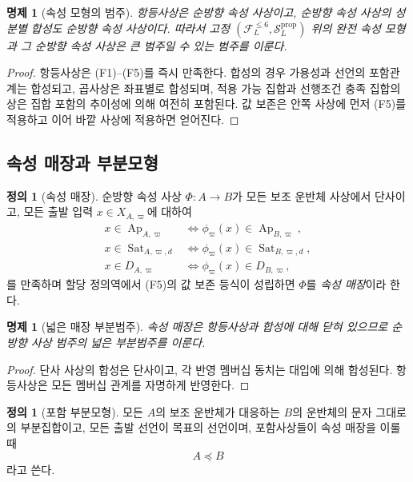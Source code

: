 \documentclass[11pt]{article}
\newcommand{\FVI}{\mathcal F_{L}^{\le 6}}
\newcommand{\Sprop}{\mathcal S_{L}^{\mathrm{prop}}}
\newcommand{\Ap}{\operatorname{Ap}}
\newcommand{\Sat}{\operatorname{Sat}}
\newtheorem{proposition}[theorem]{명제}
\theoremstyle{definition}
\newtheorem{definition}[theorem]{정의}
\theoremstyle{remark}
\begin{document}
\begin{proposition}[속성 모형의 범주]
항등사상은 순방향 속성 사상이고, 순방향 속성 사상의 성분별 합성도 순방향 속성 사상이다.
따라서 고정 \((\FVI,\Sprop)\) 위의 완전 속성 모형과 그 순방향 속성 사상은 큰 범주일 수 있는 범주를 이룬다.
\end{proposition}

\begin{proof}
항등사상은 (F1)--(F5)를 즉시 만족한다.
합성의 경우 가용성과 선언의 포함관계는 합성되고, 곱사상은 좌표별로 합성되며, 적용 가능 집합과 선행조건 충족 집합의 상은 집합 포함의 추이성에 의해 여전히 포함된다.
값 보존은 안쪽 사상에 먼저 (F5)를 적용하고 이어 바깥 사상에 적용하면 얻어진다.
\end{proof}

\subsection{속성 매장과 부분모형}

\begin{definition}[속성 매장]
순방향 속성 사상 \(\Phi:A\to B\)가 모든 보조 운반체 사상에서 단사이고, 모든 출발 입력 \(x\in X_{A,\varpi}\)에 대하여
\[
\begin{aligned}
x\in\Ap_{A,\varpi}
&\Longleftrightarrow
\phi_{\varpi}(x)\in\Ap_{B,\varpi},\\
x\in\Sat_{A,\varpi,d}
&\Longleftrightarrow
\phi_{\varpi}(x)\in\Sat_{B,\varpi,d},\\
x\in D_{A,\varpi}
&\Longleftrightarrow
\phi_{\varpi}(x)\in D_{B,\varpi},
\end{aligned}
\]
를 만족하며 할당 정의역에서 (F5)의 값 보존 등식이 성립하면 \(\Phi\)를 \emph{속성 매장}이라 한다.
\end{definition}

\begin{proposition}[넓은 매장 부분범주]
속성 매장은 항등사상과 합성에 대해 닫혀 있으므로 순방향 사상 범주의 넓은 부분범주를 이룬다.
\end{proposition}

\begin{proof}
단사 사상의 합성은 단사이고, 각 반영 멤버십 동치는 대입에 의해 합성된다.
항등사상은 모든 멤버십 관계를 자명하게 반영한다.
\end{proof}

\begin{definition}[포함 부분모형]
모든 \(A\)의 보조 운반체가 대응하는 \(B\)의 운반체의 문자 그대로의 부분집합이고, 모든 출발 선언이 목표의 선언이며, 포함사상들이 속성 매장을 이룰 때
\[
A\preccurlyeq B
\]
라고 쓴다.
\end{definition}
\end{document}

